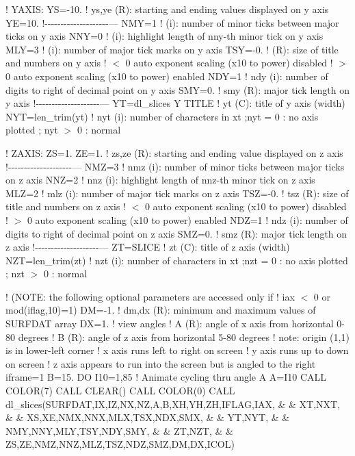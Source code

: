 ! Y\+A\+X\+IS\+: YS=-\/10. ! ys,ye (R)\+: starting and ending values displayed on y axis YE=10. !-\/-\/-\/-\/-\/-\/-\/-\/-\/-\/-\/-\/-\/-\/-\/-\/-\/-\/-\/-\/--- N\+MY=1 ! (i)\+: number of minor ticks between major ticks on y axis N\+NY=0 ! (i)\+: highlight length of nny-\/th minor tick on y axis M\+LY=3 ! (i)\+: number of major tick marks on y axis T\+SY=-\/0. ! (R)\+: size of title and numbers on y axis ! $<$ 0 auto exponent scaling (x10 to power) disabled ! $>$ 0 auto exponent scaling (x10 to power) enabled N\+DY=1 ! ndy (i)\+: number of digits to right of decimal point on y axis S\+MY=0. ! smy (R)\+: major tick length on y axis !-\/-\/-\/-\/-\/-\/-\/-\/-\/-\/-\/-\/-\/-\/-\/-\/-\/-\/-\/-\/--- YT=\textquotesingle{}dl\+\_\+slices Y T\+I\+T\+LE\textquotesingle{} ! yt (C)\+: title of y axis (width) N\+YT=len\+\_\+trim(yt) ! nyt (i)\+: number of characters in xt ;nyt = 0 \+: no axis plotted ; nyt $>$ 0 \+: normal

! Z\+A\+X\+IS\+: ZS=1. ZE=1. ! zs,ze (R)\+: starting and ending value displayed on z axis !-\/-\/-\/-\/-\/-\/-\/-\/-\/-\/-\/-\/-\/-\/-\/-\/-\/-\/-\/-\/--- N\+MZ=3 ! nmz (i)\+: number of minor ticks between major ticks on z axis N\+NZ=2 ! nnz (i)\+: highlight length of nnz-\/th minor tick on z axis M\+LZ=2 ! mlz (i)\+: number of major tick marks on z axis T\+SZ=-\/0. ! tsz (R)\+: size of title and numbers on z axis ! $<$ 0 auto exponent scaling (x10 to power) disabled ! $>$ 0 auto exponent scaling (x10 to power) enabled N\+DZ=1 ! ndz (i)\+: number of digits to right of decimal point on z axis S\+MZ=0. ! smz (R)\+: major tick length on z axis !-\/-\/-\/-\/-\/-\/-\/-\/-\/-\/-\/-\/-\/-\/-\/-\/-\/-\/-\/-\/--- ZT=\textquotesingle{}S\+L\+I\+CE\textquotesingle{} ! zt (C)\+: title of z axis (width) N\+ZT=len\+\_\+trim(zt) ! nzt (i)\+: number of characters in xt ;nzt = 0 \+: no axis plotted ; nzt $>$ 0 \+: normal

! (N\+O\+TE\+: the following optional parameters are accessed only if ! iax $<$ 0 or mod(iflag,10)=1) DM=-\/1. ! dm,dx (R)\+: minimum and maximum values of S\+U\+R\+F\+D\+AT array DX=1. ! view angles ! A (R)\+: angle of x axis from horizontal 0-\/80 degrees ! B (R)\+: angle of z axis from horizontal 5-\/80 degrees ! note\+: origin (1,1) is in lower-\/left corner ! x axis runs left to right on screen ! y axis runs up to down on screen ! z axis appears to run into the screen but is angled to the right iframe=1 B=15. DO I10=1,85 ! Animate cycling thru angle A A=I10 C\+A\+LL C\+O\+L\+O\+R(7) C\+A\+LL C\+L\+E\+A\+R() C\+A\+LL C\+O\+L\+O\+R(0) C\+A\+LL dl\+\_\+slices(S\+U\+R\+F\+D\+AT,IX,IZ,NX,NZ,A,B,XH,YH,ZH,I\+F\+L\+AG,I\+AX, \& \& XT,N\+XT, \& \& XS,XE,N\+MX,N\+NX,M\+LX,T\+SX,N\+DX,S\+MX, \& \& YT,N\+YT, \& \& N\+MY,N\+NY,M\+LY,T\+SY,N\+DY,S\+MY, \& \& ZT,N\+ZT, \& \& ZS,ZE,N\+MZ,N\+NZ,M\+LZ,T\+SZ,N\+DZ,S\+MZ,DM,DX,I\+C\+OL)

